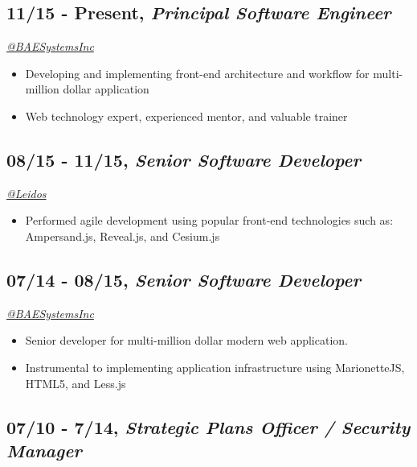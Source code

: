 \documentclass[10pt]{article}
\def\tightlist{}
\begin{document}
\subsection{\texorpdfstring{11/15 - Present, \textbf{\emph{Principal
Software
Engineer}}}{11/15 - Present, Principal Software Engineer}}\label{present-principal-software-engineer}

\emph{\href{https://twitter.com/BAESystemsInc}{@BAESystemsInc}}

\begin{itemize}
\tightlist
\item
  Developing and implementing front-end architecture and workflow for
  multi-million dollar application
\item
  Web technology expert, experienced mentor, and valuable trainer
\end{itemize}

\subsection{\texorpdfstring{08/15 - 11/15, \textbf{\emph{Senior Software
Developer}}}{08/15 - 11/15, Senior Software Developer}}\label{senior-software-developer}

\emph{\href{https://twitter.com/LeidosInc}{@Leidos}}

\begin{itemize}
\tightlist
\item
  Performed agile development using popular front-end technologies such
  as: Ampersand.js, Reveal.js, and Cesium.js
\end{itemize}

\subsection{\texorpdfstring{07/14 - 08/15, \textbf{\emph{Senior Software
Developer}}}{07/14 - 08/15, Senior Software Developer}}\label{senior-software-developer-1}

\emph{\href{https://twitter.com/BAESystemsInc}{@BAESystemsInc}}

\begin{itemize}
\tightlist
\item
  Senior developer for multi-million dollar modern web application.
\item
  Instrumental to implementing application infrastructure using
  MarionetteJS, HTML5, and Less.js
\end{itemize}

\subsection{\texorpdfstring{07/10 - 7/14, \textbf{\emph{Strategic Plans
Officer / Security
Manager}}}{07/10 - 7/14, Strategic Plans Officer / Security Manager}}\label{strategic-plans-officer-security-manager}
\end{document}

